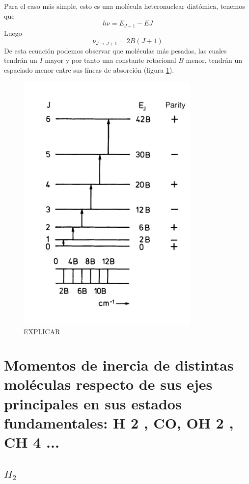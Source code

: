 \documentclass[a4paper]{article}
\begin{document}
Para el caso más simple, esto es una molécula heteronuclear diatómica, tenemos que 
\begin{equation}
h\nu = E_{J+1}-E{J}
\end{equation}
Luego
\begin{equation}
\nu_{J \rightarrow J+1} = 2B(J+1)
\end{equation}
De esta ecuación podemos observar que moléculas más pesadas, las cuales tendrán un $I$ mayor y por tanto una constante rotacional $B$ menor, tendrán un espaciado menor entre sus líneas de absorción (figura \ref{niveles1}).
\begin{figure}
\includegraphics[width=0.8\textwidth]{niveles1.png}
\caption{EXPLICAR}
\label{niveles1}
\end{figure}
\section{Momentos de inercia de distintas moléculas respecto de sus ejes principales en sus estados fundamentales: H 2 , CO, OH 2 , CH 4 ...}
\subsection{$H_2$}
\end{document}
